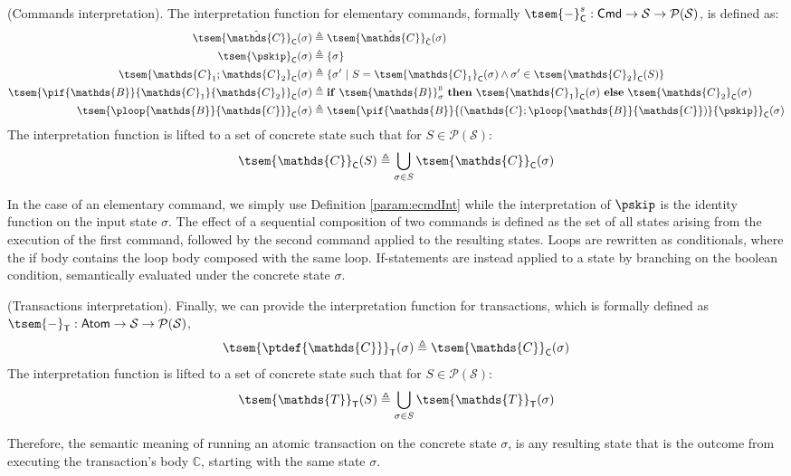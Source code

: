 \begin{defn}
	(Commands interpretation).
	The interpretation function for elementary commands, formally $\tsem{-}^s_{\mathsf{C}} : \mathsf{Cmd} \rightarrow \mathcal{S} \rightarrow \mathcal{P}(\mathcal{S})$, is defined as:
	\begin{align*}
		\tsem{\hat{\mathds{C}}}_{\mathsf{C}}(\sigma) &\triangleq \tsem{\hat{\mathds{C}}}_{\hat{\mathsf{C}}}(\sigma)
		\\
		\tsem{\pskip}_{\mathsf{C}}(\sigma) &\triangleq \{ \sigma \}
		\\
		\tsem{\mathds{C}_1 ; \mathds{C}_2}_{\mathsf{C}}(\sigma) &\triangleq \{ \sigma'\ |\ S = \tsem{\mathds{C}_1}_\mathsf{C}(\sigma) \land \sigma' \in \tsem{\mathds{C}_2}_\mathsf{C}(S) \}
		\\
		\tsem{\pif{\mathds{B}}{\mathds{C}_1}{\mathds{C}_2}}_\mathsf{C}(\sigma) &\triangleq \mathbf{if}\ \tsem{\mathds{B}}^\textsc{b}_{\sigma}\ \mathbf{then}\ \tsem{\mathds{C}_1}_\mathsf{C}(\sigma)\ \mathbf{else}\ \tsem{\mathds{C}_2}_\mathsf{C}(\sigma)
		\\
		\tsem{\ploop{\mathds{B}}{\mathds{C}}}_\mathsf{C}(\sigma) &\triangleq \tsem{\pif{\mathds{B}}{\left(\mathds{C};\ploop{\mathds{B}}{\mathds{C}}\right)}{\pskip}}_\mathsf{C}(\sigma)
	\end{align*}
	The interpretation function is lifted to a set of concrete state such that for $S \in \mathcal{P}(\mathcal{S})$:
	\[
		\tsem{\mathds{C}}_\mathsf{C}(S) \triangleq \bigcup_{\sigma \in S} \tsem{\mathds{C}}_\mathsf{C}(\sigma)
	\]	
\end{defn}
In the case of an elementary command, we simply use Definition \ref{param:ecmdInt} while the interpretation of $\pskip$ is the identity function on the input state $\sigma$. The effect of a sequential composition of two commands is defined as the set of all states arising from the execution of the first command, followed by the second command applied to the resulting states. Loops are rewritten as conditionals, where the if body contains the loop body composed with the same loop. If-statements are instead applied to a state by branching on the boolean condition, semantically evaluated under the concrete state $\sigma$.

\begin{defn}
	(Transactions interpretation).
	Finally, we can provide the interpretation function for transactions, which is formally defined as $\tsem{-}_\mathsf{T} : \mathsf{Atom} \rightarrow \mathcal{S} \rightarrow \mathcal{P}(\mathcal{S})$,
	\[
		\tsem{\ptdef{\mathds{C}}}_\mathsf{T}(\sigma) \triangleq \tsem{\mathds{C}}_\mathsf{C}(\sigma)
	\]
	The interpretation function is lifted to a set of concrete state such that for $S \in \mathcal{P}(\mathcal{S})$:
	\[
		\tsem{\mathds{T}}_\mathsf{T}(S) \triangleq \bigcup_{\sigma \in S}  \tsem{\mathds{T}}_\mathsf{T}(\sigma)
	\]
\end{defn}
Therefore, the semantic meaning of running an atomic transaction on the concrete state $\sigma$, is any resulting state that is the outcome from executing the transaction's body $\mathds{C}$, starting with the same state $\sigma$.